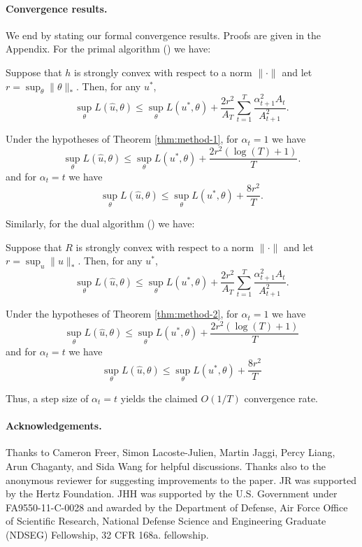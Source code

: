 \documentclass{article} %
\begin{document}
\paragraph{Convergence results.}
We end by stating our formal convergence results. Proofs are given in the Appendix. For the primal algorithm 
(\primal) we have:
\begin{theorem}
\label{thm:method-1}
Suppose that $h$ is strongly convex with respect to a norm $\|\cdot\|$ 
and let $r = \sup_{\theta} \|\theta\|_{*}$. Then, for any $u^*$,
\[ \sup_{\theta} L(\hat{u}, \theta) \leq \sup_{\theta} L(u^*, \theta) + \frac{2r^2}{A_T} \sum_{t=1}^T \frac{\alpha_{t+1}^2A_t}{A_{t+1}^2}. \]
\end{theorem}
\begin{corollary} 
\label{cor:method-1}
Under the hypotheses of Theorem \ref{thm:method-1}, for $\alpha_{t} = 1$ we have
\[ \sup_{\theta} L(\hat{u}, \theta) \leq \sup_{\theta} L(u^*, \theta) + \frac{2r^2 (\log (T) + 1)}{T}. \]
and for $\alpha_t = t$ we have
\[ \sup_{\theta} L(\hat{u}, \theta) \leq \sup_{\theta} L(u^*, \theta) + \frac{8r^2}{T}. \]
\end{corollary}
Similarly, for the dual algorithm (\dual) we have:
\begin{theorem}
\label{thm:method-2}
Suppose that $R$ is strongly convex with respect to a norm $\|\cdot\|$ 
and let $r = \sup_{u} \|u\|_{*}$. Then, for any $u^*$,
\[ \sup_{\theta} L(\hat{u}, \theta) \leq \sup_{\theta} L(u^*, \theta) + \frac{2r^2}{A_T} \sum_{t=1}^T \frac{\alpha_{t+1}^2A_t}{A_{t+1}^2}. \]
\end{theorem}
\begin{corollary}
\label{cor:method-2}
Under the hypotheses of Theorem \ref{thm:method-2}, for $\alpha_t = 1$ we have
\[ \sup_{\theta} L(\hat{u}, \theta) \leq \sup_{\theta} L(u^*, \theta) + \frac{2r^2(\log(T) + 1)}{T} \]
and for $\alpha_t = t$ we have
\[ \sup_{\theta} L(\hat{u}, \theta) \leq \sup_{\theta} L(u^*, \theta) + \frac{8r^2}{T} \]
\end{corollary}
Thus, a step size of $\alpha_t = t$ yields the claimed $O(1/T)$ convergence rate.

\paragraph{Acknowledgements.}
Thanks to Cameron Freer, Simon Lacoste-Julien, Martin Jaggi, Percy Liang, Arun Chaganty, and Sida Wang 
for helpful discussions. Thanks also to the anonymous reviewer for suggesting improvements 
to the paper. JR was supported by the Hertz Foundation. JHH was supported by the U.S. Government under FA9550-11-C-0028 and awarded by the Department of Defense, Air Force Office of Scientific Research, National Defense Science and Engineering Graduate (NDSEG) Fellowship, 32 CFR 168a.
fellowship.
\end{document}
